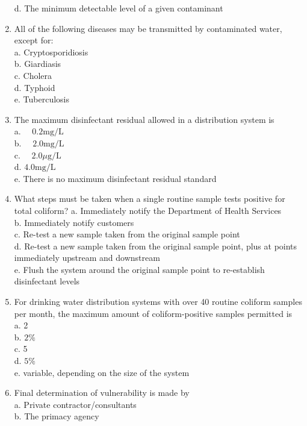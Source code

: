 \begin{enumerate}
d. The minimum detectable level of a given contaminant\\
\item All of the following diseases may be transmitted by contaminated water, except for:\\
a. Cryptosporidiosis\\
b. Giardiasis\\
c. Cholera\\
d. Typhoid\\
e. Tuberculosis\\
\item The maximum disinfectant residual allowed in a distribution system is\\
a. $\quad 0.2 \mathrm{mg} / \mathrm{L}$\\
b. $\quad 2.0 \mathrm{mg} / \mathrm{L}$\\
c. $\quad 2.0 \mu \mathrm{g} / \mathrm{L}$\\
d. $4.0 \mathrm{mg} / \mathrm{L}$\\
e. There is no maximum disinfectant residual standard\\
\item What steps must be taken when a single routine sample tests positive for total coliform? a. Immediately notify the Department of Health Services\\
b. Immediately notify customers\\
c. Re-test a new sample taken from the original sample point\\
d. Re-test a new sample taken from the original sample point, plus at points immediately upstream and downstream\\
e. Flush the system around the original sample point to re-establish disinfectant levels\\
\item For drinking water distribution systems with over 40 routine coliform samples per month, the maximum amount of coliform-positive samples permitted is\\
a. 2\\
b. $2 \%$\\
c. 5\\
d. $5 \%$\\
e. variable, depending on the size of the system\\
\item Final determination of vulnerability is made by\\
a. Private contractor/consultants\\
b. The primacy agency\\

\end{enumerate}
